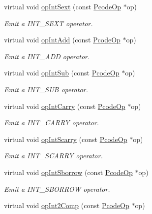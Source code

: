 \begin{DoxyCompactItemize}
virtual void \mbox{\hyperlink{class_print_c_aed96120b216315afb65d4671877a6e25}{op\+Int\+Sext}} (const \mbox{\hyperlink{class_pcode_op}{Pcode\+Op}} $\ast$op)
\begin{DoxyCompactList}\small\item\em Emit a I\+N\+T\+\_\+\+S\+E\+XT operator. \end{DoxyCompactList}\item 
virtual void \mbox{\hyperlink{class_print_c_a2e8f8722bdcb706f9bff0e877ad6e8c7}{op\+Int\+Add}} (const \mbox{\hyperlink{class_pcode_op}{Pcode\+Op}} $\ast$op)
\begin{DoxyCompactList}\small\item\em Emit a I\+N\+T\+\_\+\+A\+DD operator. \end{DoxyCompactList}\item 
virtual void \mbox{\hyperlink{class_print_c_a3bb1f53fd2da51d91bb5b034dddfff04}{op\+Int\+Sub}} (const \mbox{\hyperlink{class_pcode_op}{Pcode\+Op}} $\ast$op)
\begin{DoxyCompactList}\small\item\em Emit a I\+N\+T\+\_\+\+S\+UB operator. \end{DoxyCompactList}\item 
virtual void \mbox{\hyperlink{class_print_c_a5c6c0fccc19cb1d15357de996887ddaa}{op\+Int\+Carry}} (const \mbox{\hyperlink{class_pcode_op}{Pcode\+Op}} $\ast$op)
\begin{DoxyCompactList}\small\item\em Emit a I\+N\+T\+\_\+\+C\+A\+R\+RY operator. \end{DoxyCompactList}\item 
virtual void \mbox{\hyperlink{class_print_c_a4b0b3a4df12ddf2842a3dfd94f45cf4d}{op\+Int\+Scarry}} (const \mbox{\hyperlink{class_pcode_op}{Pcode\+Op}} $\ast$op)
\begin{DoxyCompactList}\small\item\em Emit a I\+N\+T\+\_\+\+S\+C\+A\+R\+RY operator. \end{DoxyCompactList}\item 
virtual void \mbox{\hyperlink{class_print_c_a81b06c00f916331d34451e6f28b51906}{op\+Int\+Sborrow}} (const \mbox{\hyperlink{class_pcode_op}{Pcode\+Op}} $\ast$op)
\begin{DoxyCompactList}\small\item\em Emit a I\+N\+T\+\_\+\+S\+B\+O\+R\+R\+OW operator. \end{DoxyCompactList}\item 
virtual void \mbox{\hyperlink{class_print_c_a82aeb4e5dce60f09dd0a5b23793e4295}{op\+Int2\+Comp}} (const \mbox{\hyperlink{class_pcode_op}{Pcode\+Op}} $\ast$op)

\end{DoxyCompactItemize}
